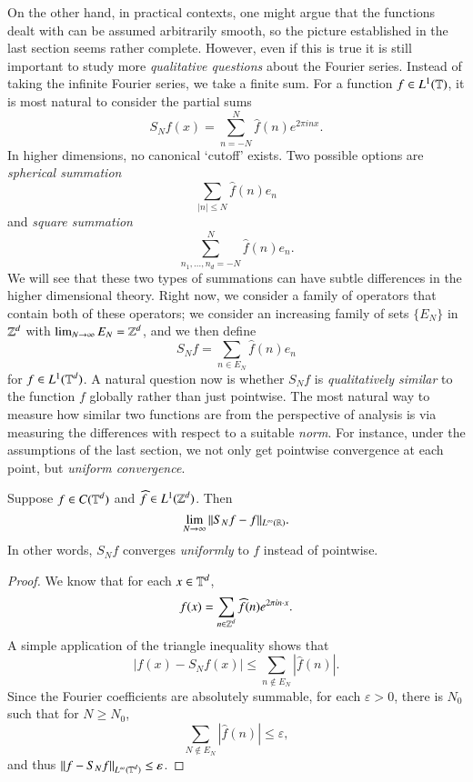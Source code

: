 On the other hand, in practical contexts, one might argue that the functions dealt with can be assumed arbitrarily smooth, so the picture established in the last section seems rather complete. However, even if this is true it is still important to study more \emph{qualitative questions} about the Fourier series. Instead of taking the infinite Fourier series, we take a finite sum. For a function $f \in L^1(\operatorname{\mathbb{T}})$, it is most natural to consider the partial sums
%
\[ S_N f(x) = \sum_{n = -N}^N \widehat{f}(n) e^{2 \pi i n x}. \]
%
In higher dimensions, no canonical `cutoff' exists. Two possible options are \emph{spherical summation}
%
\[ \sum_{|n| \leq N} \widehat{f}(n) e_n \]
%
and \emph{square summation}
%
\[ \sum_{n_1, \dots, n_d = -N}^N \widehat{f}(n) e_n. \]
%
We will see that these two types of summations can have subtle differences in the higher dimensional theory. Right now, we consider a family of operators that contain both of these operators; we consider an increasing family of sets $\{ E_N \}$ in $\operatorname{\mathbb{Z}}^d$ with $\lim_{N \to \infty} E_N = \operatorname{\mathbb{Z}}^d$, and we then define
%
\[ S_N f = \sum_{n \in E_N} \widehat{f}(n) e_n \]
%
for $f \in L^1(\operatorname{\mathbb{T}}^d)$. A natural question now is whether $S_N f$ is \emph{qualitatively similar} to the function $f$ globally rather than just pointwise. The most natural way to measure how similar two functions are from the perspective of analysis is via measuring the differences with respect to a suitable \emph{norm}. For instance, under the assumptions of the last section, we not only get pointwise convergence at each point, but \emph{uniform convergence}.


\begin{theorem}
    Suppose $f \in C(\operatorname{\mathbb{T}}^d)$ and $\widehat{f} \in L^1(\operatorname{\mathbb{Z}}^d)$. Then
    \[ \lim_{N \to \infty} \| S_N f - f \|_{L^\infty(\operatorname{\mathbb{R}})}. \]
    In other words, $S_N f$ converges \emph{uniformly} to $f$ instead of pointwise.
\end{theorem}
\begin{proof}
    We know that for each $x \in \operatorname{\mathbb{T}}^d$,
    \[ f(x) = \sum_{n \in \operatorname{\mathbb{Z}}^d} \widehat{f}(n) e^{2 \pi i n \cdot x}. \]
    A simple application of the triangle inequality shows that
    \[ |f(x) - S_N f(x)| \leq \sum_{n \not \in E_N} |\widehat{f}(n)|. \]
    Since the Fourier coefficients are absolutely summable, for each $\varepsilon > 0$, there is $N_0$ such that for $N \geq N_0$,
    \[ \sum_{N \not \in E_N} |\widehat{f}(n)| \leq \varepsilon, \]
    and thus $\| f - S_N f \|_{L^\infty(\operatorname{\mathbb{T}}^d)} \leq \varepsilon$.
\end{proof}

